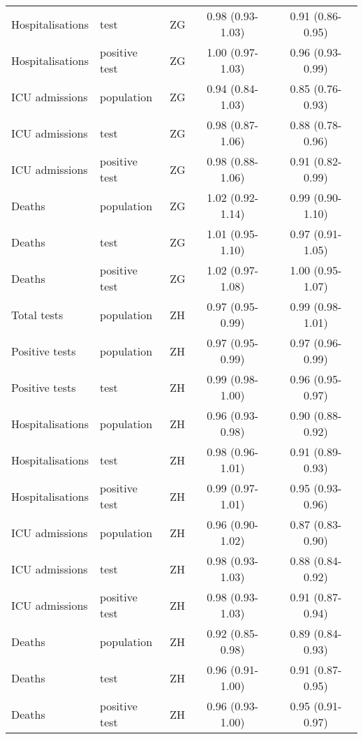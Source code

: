 \documentclass{article}
\begin{document}
\begin{longtable}{lllcc}
		Hospitalisations & test & ZG & 0.98 (0.93-1.03) & 0.91 (0.86-0.95) \\ 
		Hospitalisations & positive test & ZG & 1.00 (0.97-1.03) & 0.96 (0.93-0.99) \\ 
		ICU admissions & population & ZG & 0.94 (0.84-1.03) & 0.85 (0.76-0.93) \\ 
		ICU admissions & test & ZG & 0.98 (0.87-1.06) & 0.88 (0.78-0.96) \\ 
		ICU admissions & positive test & ZG & 0.98 (0.88-1.06) & 0.91 (0.82-0.99) \\ 
		Deaths & population & ZG & 1.02 (0.92-1.14) & 0.99 (0.90-1.10) \\ 
		Deaths & test & ZG & 1.01 (0.95-1.10) & 0.97 (0.91-1.05) \\ 
		Deaths & positive test & ZG & 1.02 (0.97-1.08) & 1.00 (0.95-1.07) \\ 
		Total tests & population & ZH & 0.97 (0.95-0.99) & 0.99 (0.98-1.01) \\ 
		Positive tests & population & ZH & 0.97 (0.95-0.99) & 0.97 (0.96-0.99) \\ 
		Positive tests & test & ZH & 0.99 (0.98-1.00) & 0.96 (0.95-0.97) \\ 
		Hospitalisations & population & ZH & 0.96 (0.93-0.98) & 0.90 (0.88-0.92) \\ 
		Hospitalisations & test & ZH & 0.98 (0.96-1.01) & 0.91 (0.89-0.93) \\ 
		Hospitalisations & positive test & ZH & 0.99 (0.97-1.01) & 0.95 (0.93-0.96) \\ 
		ICU admissions & population & ZH & 0.96 (0.90-1.02) & 0.87 (0.83-0.90) \\ 
		ICU admissions & test & ZH & 0.98 (0.93-1.03) & 0.88 (0.84-0.92) \\ 
		ICU admissions & positive test & ZH & 0.98 (0.93-1.03) & 0.91 (0.87-0.94) \\ 
		Deaths & population & ZH & 0.92 (0.85-0.98) & 0.89 (0.84-0.93) \\ 
		Deaths & test & ZH & 0.96 (0.91-1.00) & 0.91 (0.87-0.95) \\ 
		Deaths & positive test & ZH & 0.96 (0.93-1.00) & 0.95 (0.91-0.97) \\ 
		\hline
	\end{longtable}
	
	
	
	
	
\end{document}
